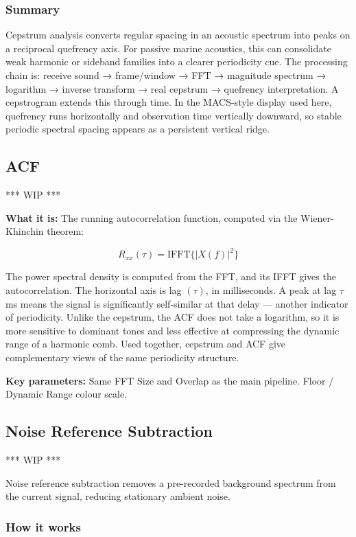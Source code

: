 \subsubsection{Summary}

Cepstrum analysis converts regular spacing in an acoustic spectrum into peaks on a reciprocal quefrency axis. For passive marine acoustics, this can consolidate weak harmonic or sideband families into a clearer periodicity cue. The processing chain is: receive sound → frame/window → FFT → magnitude spectrum → logarithm → inverse transform → real cepstrum → quefrency interpretation. A cepstrogram extends this through time. In the MACS-style display used here, quefrency runs horizontally and observation time vertically downward, so stable periodic spectral spacing appears as a persistent vertical ridge.

\subsection{ACF}
\textcolor{commentGreen}{*** WIP ***}

\textbf{What it is:} The running autocorrelation function, computed via the Wiener-Khinchin theorem:

\[
R_{xx}(\tau) = \mathrm{IFFT}\{ |X(f)|^2\}
\]

The power spectral density is computed from the FFT, and its IFFT gives the autocorrelation. The horizontal axis is lag $(\tau)$, in milliseconds. A peak at lag $\tau$ ms means the signal is significantly self-similar at that delay — another indicator of periodicity. Unlike the cepstrum, the ACF does not take a logarithm, so it is more sensitive to dominant tones and less effective at compressing the dynamic range of a harmonic comb. Used together, cepstrum and ACF give complementary views of the same periodicity structure.

\textbf{Key parameters:} Same FFT Size and Overlap as the main pipeline. Floor / Dynamic Range colour scale.

\subsection{Noise Reference Subtraction}
\textcolor{commentGreen}{*** WIP ***}

Noise reference subtraction removes a pre-recorded background spectrum from the current signal, reducing stationary ambient noise.

\subsubsection{How it works}

